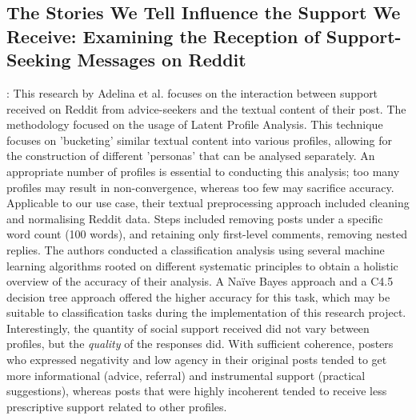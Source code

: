\subsection{The Stories We Tell Influence the Support We Receive: Examining the Reception of Support-Seeking Messages on Reddit}
\cite{adelina-2023}: This research by Adelina et al. focuses on the interaction between support received on Reddit from advice-seekers and the textual content of their post. The methodology focused on the usage of Latent Profile Analysis. This technique focuses on 'bucketing' similar textual content into various profiles, allowing for the construction of different 'personas' that can be analysed separately. An appropriate number of profiles is essential to conducting this analysis; too many profiles may result in non-convergence, whereas too few may sacrifice accuracy. \\

Applicable to our use case, their textual preprocessing approach included cleaning and normalising Reddit data. Steps included removing posts under a specific word count (100 words), and retaining only first-level comments, removing nested replies. The authors conducted a classification analysis using several machine learning algorithms rooted on different systematic principles to obtain a holistic overview of the accuracy of their analysis. A Naïve Bayes approach and a C4.5 decision tree approach offered the higher accuracy for this task, which may be suitable to classification tasks during the implementation of this research project. \\

Interestingly, the quantity of social support received did not vary between profiles, but the \textit{quality} of the responses did. With sufficient coherence, posters who expressed negativity and low agency in their original posts tended to get more informational (advice, referral) and instrumental support (practical suggestions), whereas posts that were highly incoherent tended to receive less prescriptive support related to other profiles.
